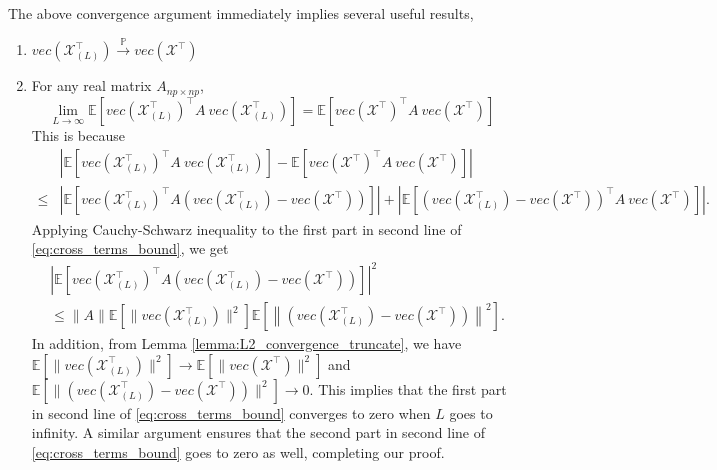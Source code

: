\begin{remark}
The above convergence argument immediately implies several useful results,
\begin{enumerate}
    \item $vec(\mathcal{\mathcal{X}}_{(L)}^\top)\overset{\mathbb{P}}{\to} vec(\mathcal{\mathcal{X}}^\top)$
    \item For any real matrix $A_{np\times np}$, 
    \begin{equation*}
       \lim_{L\rightarrow \infty}\mathbb{E} \left[ vec(\mathcal{\mathcal{X}}_{(L)}^\top)^\top A ~ vec(\mathcal{\mathcal{X}}_{(L)}^\top)\right] =  \mathbb{E} \left[ vec(\mathcal{\mathcal{X}}^\top)^\top A ~ vec(\mathcal{\mathcal{X}}^\top)\right]
    \end{equation*}
This is because
\begin{equation}
\label{eq:cross_terms_bound}
\begin{aligned}
& \left|\mathbb{E} \left[ vec(\mathcal{X}_{(L)}^\top)^\top A ~ vec(\mathcal{X}_{(L)}^\top)\right] - \mathbb{E} \left[ vec(\mathcal{X}^\top)^\top A ~ vec(\mathcal{X}^\top)\right]\right| \\
\le & \left|\mathbb{E} \left[ vec(\mathcal{X}_{(L)}^\top)^\top A  \left(vec(\mathcal{X}_{(L)}^\top)-vec(\mathcal{X}^\top)\right)\right] \right|+ \left| \mathbb{E} \left[ \left(vec(\mathcal{X}_{(L)}^\top)-vec(\mathcal{X}^\top)\right)^\top A ~ vec(\mathcal{X}^\top )\right]\right|.
\end{aligned}
\end{equation}
Applying Cauchy-Schwarz inequality to the first part in second line of \eqref{eq:cross_terms_bound}, we get 
\begin{equation*}
\begin{aligned}
&\left|\mathbb{E} \left[ vec(\mathcal{\mathcal{X}}_{(L)}^\top)^\top A  \left(vec(\mathcal{X}_{(L)}^\top)-vec(\mathcal{\mathcal{X}}^\top)\right)\right]\right|^2 \\
&\le \|A\| \mathbb{E} \left[ \|vec(\mathcal{X}_{(L)}^\top)\|^2\right] \mathbb{E} \left[ \left\|\left(vec(\mathcal{X}_{(L)}^\top)-vec(\mathcal{\mathcal{X}}^\top)\right)\right\|^2\right].
\end{aligned}
\end{equation*}
In addition, from Lemma \ref{lemma:L2_convergence_truncate}, we have 
$\mathbb{E} \left[ \|vec(\mathcal{\mathcal{X}}_{(L)}^\top)\|^2\right]\rightarrow \mathbb{E} \left[ \|vec(\mathcal{\mathcal{X}}^\top)\|^2\right] $ and \\
 $ \mathbb{E} \left[ \|\left(vec(\mathcal{X}_{(L)}^\top)-vec(\mathcal{\mathcal{X}}^\top)\right)\|^2\right]\rightarrow 0$. This implies that the first part in second line of \eqref{eq:cross_terms_bound} converges to zero when $L$ goes to infinity. A similar argument ensures that the second part in second line of \eqref{eq:cross_terms_bound} goes to zero as well, completing our proof.
\end{enumerate}
\end{remark}

